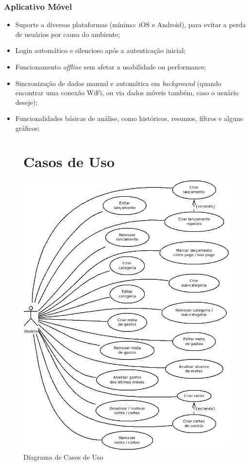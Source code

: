 \documentclass[a4paper]{abnt}
\begin{document}
\subsubsection{Aplicativo Móvel}
\begin{itemize}
	\item Suporte a diversas plataformas (mínimo: iOS e Android), para evitar a perda de usuários por causa do ambiente;
	\item Login automático e silencioso após a autenticaç\~ao inicial;
	\item Funcionamento \emph{offline} sem afetar a usabilidade ou performance;
	\item Sincronizaç\~ao de dados manual e automática em \emph{background} (quando encontrar uma conex\~ao WiFi, ou via dados móveis também, caso o usuário deseje);
	\item Funcionalidades básicas de análise, como históricos, resumos, filtros e alguns gráficos;
\end{itemize}
		

\begin{figure}
	\section{Casos de Uso}
	\centering
	\includegraphics[scale=0.6]{diagramas/casos-de-uso.jpg}
	\caption{Diagrama de Casos de Uso}
\end{figure}
\end{document}
